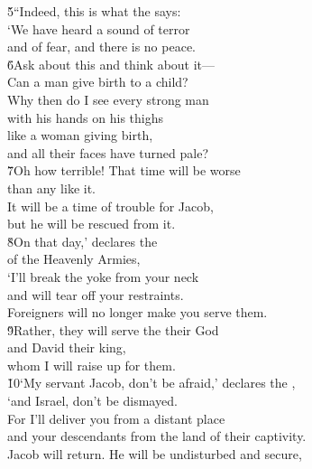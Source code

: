 \begin{poetry}
\poeml \v{5}``Indeed, this is what the  says: \\
\poeml `We have heard a sound of terror \\
\poemll    and of fear, and there is no peace. \\
\poeml \v{6}Ask about this and think about it--- \\
\poemll    Can a man give birth to a child? \\
\poeml Why then do I see every strong man \\
\poemll    with his hands on his thighs \\
\poeml like a woman giving birth, \\
\poemll    and all their faces have turned pale? \\
\poeml \v{7}Oh how terrible! That time will be worse \\
\poemll    than any like it. \\
\poeml It will be a time of trouble for Jacob, \\
\poemll    but he will be rescued from it. \\
\poeml \v{8}On that day,' declares the  \\
\poemll    of the Heavenly Armies, \\
\poeml `I'll break the yoke from your neck \\
\poemll    and will tear off your restraints. \\
\poemlll       Foreigners will no longer make you serve them. \\
\poeml \v{9}Rather, they will serve the  their God \\
\poemll    and David their king, \\
\poemlll       whom I will raise up for them. \\
\poeml \v{10}`My servant Jacob, don't be afraid,' declares the , \\
\poemll    `and Israel, don't be dismayed. \\
\poeml For I'll deliver you from a distant place \\
\poemll    and your descendants from the land of their captivity. \\
\poeml Jacob will return. He will be undisturbed and secure, \\

\end{poetry}
